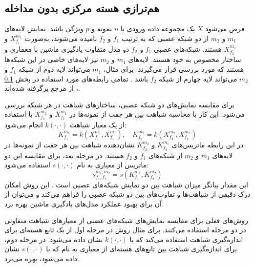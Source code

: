  \subsection{
 	هم‌ترازی هسته مرکزی بدون مداخله%
 }\label{sec_dCKA}
 فرض می‌شود \(X\) یک مجموعه داده ورودی با \(n\) نمونه و \(p\) ویژگی باشد. نمایش‌ لایه‌های \(m_1\) و \(m_2\) از دو شبکه عصبی که به ترتیب \(f_1\) و \(f_2\) نامیده می‌شوند، به‌صورت \(X^{m_1}_{f_1}\) و \(X^{m_2}_{f_2}\) هستند. شبکه‌های عصبی \(f_1\) و \(f_2\) دو مدل متفاوت یادگیری ماشین با معماری و ساختار مخصوص به خود هستند. لایه‌های \(m_1\) و \(m_2\) نیز لایه‌های خاصی در این شبکه‌ها هستند که مورد بررسی قرار می‌گیرند. برای مثال، \(m_1\) می‌تواند لایه دوم از شبکه \(f_1\) و \(m_2\) می‌تواند لایه چهارم از شبکه \(f_2\) باشد
 \cite{cui2022deconfounded}.
 تمامی رابطه‌های مورد استفاده در بخش
 \ref{sec_dCKA}%
 ، از مرجع 
 \cite{cui2022deconfounded} 
 برگرفته شده‌اند.
 
 برای مقایسه نمایش‌های دو شبکه عصبی، ساختارهای شباهت در هر شبکه بررسی می‌شود. این کار با محاسبه شباهت بین هر جفت از نمونه‌ها در \(X^{m_1}_{f_1}\) و \(X^{m_2}_{f_2}\) با استفاده از یک معیار شباهت \( k(\cdot, \cdot) \) انجام می‌شود:
 \begin{equation}
 	K^{m_1}_{f_1} = k(X^{m_1}_{f_1}, X^{m_1}_{f_1}), \quad K^{m_2}_{f_2} = k(X^{m_2}_{f_2}, X^{m_2}_{f_2})
 	\label{eq_dCKA_Kernel}
 \end{equation}
 در این رابطه ماتریس‌های \(K^{m_1}_{f_1}\) و \(K^{m_2}_{f_2}\) نشان‌دهنده شباهت بین هر جفت از نمونه‌ها در لایه‌های \(m_1\) و \(m_2\) از شبکه‌های \(f_1\) و \(f_2\) هستند. در مرحله بعد، برای مقایسه این دو ماتریس از معیاری به نام \(s(\cdot, \cdot)\) استفاده می‌شود:
 \begin{equation}
 	s^{m_1,m_2}_{f_1,f_2} = s(K^{m_1}_{f_1}, K^{m_2}_{f_2})
 	\label{eq_similarity}
 \end{equation}
 این مقدار بیانگر میزان شباهت بین دو نمایش شبکه‌های عصبی است
 \cite{cui2022deconfounded}.
 این روش امکان درک دقیقی از شباهت‌ها و تفاوت‌های بین دو شبکه عصبی را فراهم می‌کند و می‌توان از آن برای بهبود عملکرد مدل‌های یادگیری ماشین بهره برد.
 
 روش‌های فعلی برای مقایسه نمایش‌های شبکه‌های عصبی از معیارهای شباهت متفاوتی در دو مرحله استفاده می‌کنند. برای مثال روش
 در مرحله اول از یک تابع هسته‌ای برای اندازه‌گیری شباهت استفاده می‌کند که با \( k(\cdot,\cdot) \) نشان داده می‌شود. در مرحله دوم، برای اندازه‌گیری شباهت بین تابع‌های هسته‌ای از معیاری به نام
 که با \( s(\cdot,\cdot) \) نشان داده می‌شود، بهره می‌برد.
 
